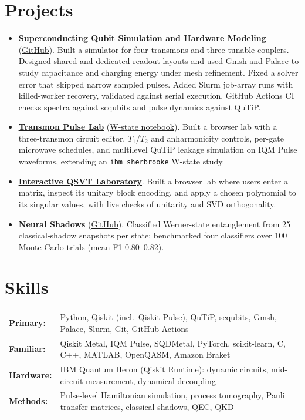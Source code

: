 \documentclass[letterpaper,10pt]{article}
\newcommand{\cvlink}[2]{\href{#1}{\underline{#2}}}
\begin{document}
\section{Projects}
\begin{itemize}
  \item \textbf{Superconducting Qubit Simulation and Hardware Modeling} (\cvlink{https://github.com/syedshubha/EmulateQPU-4Q}{GitHub}). Built a simulator for four transmons and three tunable couplers. Designed shared and dedicated readout layouts and used Gmsh and Palace to study capacitance and charging energy under mesh refinement. Fixed a solver error that skipped narrow sampled pulses. Added Slurm job-array runs with killed-worker recovery, validated against serial execution. GitHub Actions CI checks spectra against scqubits and pulse dynamics against QuTiP.
  \item \textbf{\cvlink{https://syedshubha.com/transmon/}{Transmon Pulse Lab}} (\cvlink{https://github.com/syedshubha/w-state-qiskit-pulse}{W-state notebook}). Built a browser lab with a three-transmon circuit editor, $T_1$/$T_2$ and anharmonicity controls, per-gate microwave schedules, and multilevel QuTiP leakage simulation on IQM Pulse waveforms, extending an \texttt{ibm\_sherbrooke} W-state study.
  \item \textbf{\cvlink{https://syedshubha.com/qsvt/}{Interactive QSVT Laboratory}}. Built a browser lab where users enter a matrix, inspect its unitary block encoding, and apply a chosen polynomial to its singular values, with live checks of unitarity and SVD orthogonality.
  \item \textbf{Neural Shadows} (\cvlink{https://github.com/syedshubha/ShadowTomography}{GitHub}). Classified Werner-state entanglement from 25 classical-shadow snapshots per state; benchmarked four classifiers over 100 Monte Carlo trials (mean F1 0.80--0.82).
\end{itemize}

\section{Skills}
\begin{tabularx}{\textwidth}{@{}l X@{}}
  \textbf{Primary:} & Python, Qiskit (incl.\ Qiskit Pulse), QuTiP, scqubits, Gmsh, Palace, Slurm, Git, GitHub Actions \\
  \textbf{Familiar:} & Qiskit Metal, IQM Pulse, SQDMetal, PyTorch, scikit-learn, C, C++, MATLAB, OpenQASM, Amazon Braket \\
  \textbf{Hardware:} & IBM Quantum Heron (Qiskit Runtime): dynamic circuits, mid-circuit measurement, dynamical decoupling \\
  \textbf{Methods:} & Pulse-level Hamiltonian simulation, process tomography, Pauli transfer matrices, classical shadows, QEC, QKD \\
\end{tabularx}
\end{document}
